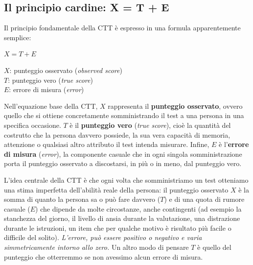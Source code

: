 \documentclass[
  italian,
  letterpaper,
  paper=A4,
  headinclude=on,
  footinclude=on,
  12pt]{scrbook}
\begin{document}
\subsection{Il principio cardine: X = T +
E}\label{il-principio-cardine-x-t-e}

Il principio fondamentale della CTT è espresso in una formula
apparentemente semplice:

\begin{tcolorbox}[enhanced jigsaw, left=2mm, colbacktitle=quarto-callout-note-color!10!white, bottomrule=.15mm, opacityback=0, coltitle=black, colframe=quarto-callout-note-color-frame, opacitybacktitle=0.6, leftrule=.75mm, colback=white, toprule=.15mm, title=\textcolor{quarto-callout-note-color}{\faInfo}\hspace{0.5em}{Definizione}, titlerule=0mm, arc=.35mm, breakable, rightrule=.15mm, bottomtitle=1mm, toptitle=1mm]

\(X = T + E\)

\(X\): punteggio osservato (\emph{observed score})\\
\(T\): punteggio vero (\emph{true score})\\
\(E\): errore di misura (\emph{error})\\

\end{tcolorbox}

Nell'equazione base della CTT, \(X\) rappresenta il \textbf{punteggio
osservato}, ovvero quello che si ottiene concretamente somministrando il
test a una persona in una specifica occasione. \(T\) è il
\textbf{punteggio vero} (\emph{true score}), cioè la quantità del
costrutto che la persona davvero possiede, la sua vera capacità di
memoria, attenzione o qualsiasi altro attributo il test intenda
misurare. Infine, \(E\) è l'\textbf{errore di misura} (\emph{error}), la
componente casuale che in ogni singola somministrazione porta il
punteggio osservato a discostarsi, in più o in meno, dal punteggio vero.

L'idea centrale della CTT è che ogni volta che somministriamo un test
otteniamo una stima imperfetta dell'abilità reale della persona: il
punteggio osservato \(X\) è la somma di quanto la persona sa o può fare
davvero (\(T\)) e di una quota di rumore casuale (\(E\)) che dipende da
molte circostanze, anche contingenti (ad esempio la stanchezza del
giorno, il livello di ansia durante la valutazione, una distrazione
durante le istruzioni, un item che per qualche motivo è risultato più
facile o difficile del solito). \emph{L'errore, può essere positivo o
negativo e varia simmetricamente intorno allo zero.} Un altro modo di
pensare \(T\) è quello del punteggio che otterremmo se non avessimo
alcun errore di misura.
\end{document}
